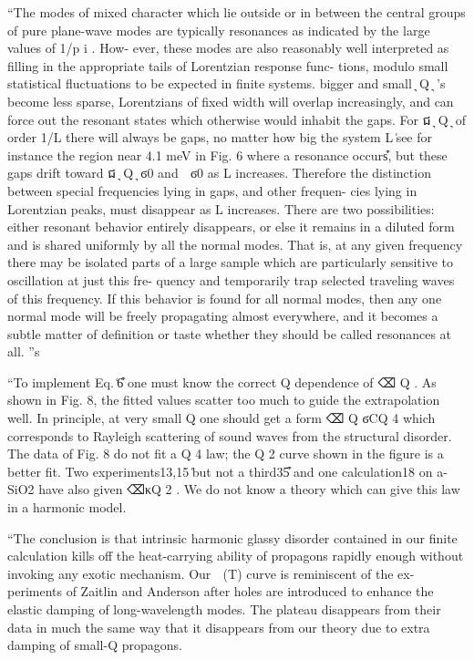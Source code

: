 \documentclass[aps,prb,twocolumn,superscriptaddress,footinbib,amsmath,amssymb,floatfix]{revtex4}
\begin{document}
``The
modes of mixed character which lie outside or in between
the central groups of pure plane-wave modes are typically
resonances as indicated by the large values of 1/p i .
How-
ever, these modes are also reasonably well interpreted as
filling in the appropriate tails of Lorentzian response func-
tions, modulo small statistical fluctuations to be expected in
finite systems.
bigger and small ͉ Q ͉ ’s become less sparse, Lorentzians of
fixed width will overlap increasingly, and can force out the
resonant states which otherwise would inhabit the gaps. For
ជ
͉ Q ͉ of order 1/L there will always be gaps, no matter how
big the system L ͑see for instance the region near 4.1 meV in
Fig. 6 where a resonance occurs͒, but these gaps drift toward
ជ
͉ Q ͉ ϭ0 and ␻ ϭ0 as L increases. Therefore the distinction
between special frequencies lying in gaps, and other frequen-
cies lying in Lorentzian peaks, must disappear as L increases.
There are two possibilities: either resonant behavior entirely
disappears, or else it remains in a diluted form and is shared
uniformly by all the normal modes. That is, at any given
frequency there may be isolated parts of a large sample
which are particularly sensitive to oscillation at just this fre-
quency and temporarily trap selected traveling waves of this
frequency. If this behavior is found for all normal modes,
then any one normal mode will be freely propagating almost
everywhere, and it becomes a subtle matter of definition or
taste whether they should be called resonances at all.
''s



``To implement Eq. ͑6͒ one must know the
correct Q dependence of ⌫ Q . As shown in Fig. 8, the fitted
values scatter too much to guide the extrapolation well. In
principle, at very small Q one should get a form ⌫ Q ϭCQ 4
which corresponds to Rayleigh scattering of sound waves
from the structural disorder. The data of Fig. 8 do not fit a
Q 4 law; the Q 2 curve shown in the figure is a better fit. Two
experiments13,15 ͑but not a third35͒ and one calculation18 on
a-SiO2 have also given ⌫κQ 2 . We do not know a theory
which can give this law in a harmonic model.


``The conclusion is that intrinsic harmonic glassy disorder
contained in our finite calculation kills off the heat-carrying
ability of propagons rapidly enough without invoking any
exotic mechanism. Our ␬ (T) curve is reminiscent of the ex-
periments of Zaitlin and Anderson after holes are introduced
to enhance the elastic damping of long-wavelength modes.
The plateau disappears from their data in much the same way
that it disappears from our theory due to extra damping of
small-Q propagons.
\end{document}
